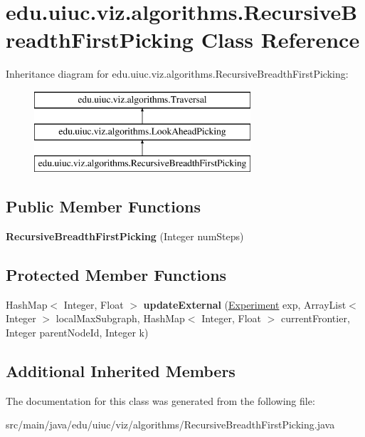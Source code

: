 \hypertarget{classedu_1_1uiuc_1_1viz_1_1algorithms_1_1_recursive_breadth_first_picking}{}\section{edu.\+uiuc.\+viz.\+algorithms.\+Recursive\+Breadth\+First\+Picking Class Reference}
\label{classedu_1_1uiuc_1_1viz_1_1algorithms_1_1_recursive_breadth_first_picking}
Inheritance diagram for edu.\+uiuc.\+viz.\+algorithms.\+Recursive\+Breadth\+First\+Picking\+:\begin{figure}[H]
\begin{center}
\leavevmode
\includegraphics[height=3.000000cm]{classedu_1_1uiuc_1_1viz_1_1algorithms_1_1_recursive_breadth_first_picking}
\end{center}
\end{figure}
\subsection*{Public Member Functions}
\begin{DoxyCompactItemize}
\item 
\mbox{\label{classedu_1_1uiuc_1_1viz_1_1algorithms_1_1_recursive_breadth_first_picking_a5370e6f374e089f3a1423eb889c0eed0}} 
{\bfseries Recursive\+Breadth\+First\+Picking} (Integer num\+Steps)
\end{DoxyCompactItemize}
\subsection*{Protected Member Functions}
\begin{DoxyCompactItemize}
\item 
\mbox{\label{classedu_1_1uiuc_1_1viz_1_1algorithms_1_1_recursive_breadth_first_picking_a236387c8532b844530d15e70b1bdbb87}} 
Hash\+Map$<$ Integer, Float $>$ {\bfseries update\+External} (\mbox{\hyperlink{classedu_1_1uiuc_1_1viz_1_1algorithms_1_1_experiment}{Experiment}} exp, Array\+List$<$ Integer $>$ local\+Max\+Subgraph, Hash\+Map$<$ Integer, Float $>$ current\+Frontier, Integer parent\+Node\+Id, Integer k)
\end{DoxyCompactItemize}
\subsection*{Additional Inherited Members}


The documentation for this class was generated from the following file\+:\begin{DoxyCompactItemize}
\item 
src/main/java/edu/uiuc/viz/algorithms/Recursive\+Breadth\+First\+Picking.\+java\end{DoxyCompactItemize}

